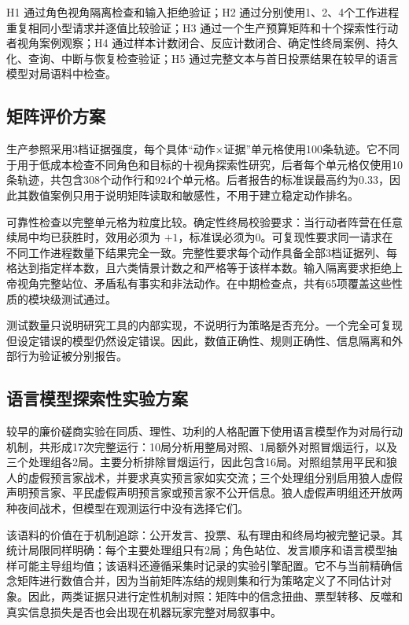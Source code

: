 \documentclass[UTF8,11pt,a4paper,fontset=windows]{ctexart}
\begin{document}
H1 通过角色视角隔离检查和输入拒绝验证；H2 通过分别使用1、2、4个工作进程重复相同小型请求并逐值比较验证；H3 通过一个生产预算矩阵和十个探索性行动者视角案例观察；H4 通过样本计数闭合、反应计数闭合、确定性终局案例、持久化、查询、中断与恢复检查验证；H5 通过完整文本与首日投票结果在较早的语言模型对局语料中检查。

\subsection{矩阵评价方案}

生产参照采用3档证据强度，每个具体“动作×证据”单元格使用100条轨迹。它不同于用于低成本检查不同角色和目标的十视角探索性研究，后者每个单元格仅使用10条轨迹，共包含308个动作行和924个单元格。后者报告的标准误最高约为0.33，因此其数值案例只用于说明矩阵读取和敏感性，不用于建立稳定动作排名。

可靠性检查以完整单元格为粒度比较。确定性终局校验要求：当行动者阵营在任意续局中均已获胜时，效用必须为 $+1$，标准误必须为0。可复现性要求同一请求在不同工作进程数量下结果完全一致。完整性要求每个动作具备全部3档证据列、每格达到指定样本数，且六类情景计数之和严格等于该样本数。输入隔离要求拒绝上帝视角完整站位、矛盾私有事实和非法动作。在中期检查点，共有65项覆盖这些性质的模块级测试通过。

测试数量只说明研究工具的内部实现，不说明行为策略是否充分。一个完全可复现但设定错误的模型仍然设定错误。因此，数值正确性、规则正确性、信息隔离和外部行为验证被分别报告。

\subsection{语言模型探索性实验方案}

较早的廉价磋商实验在同质、理性、功利的人格配置下使用语言模型作为对局行动机制，共形成17次完整运行：10局分析用整局对照、1局额外对照冒烟运行，以及三个处理组各2局。主要分析排除冒烟运行，因此包含16局。对照组禁用平民和狼人的虚假预言家战术，并要求真实预言家如实交流；三个处理组分别启用狼人虚假声明预言家、平民虚假声明预言家或预言家不公开信息。狼人虚假声明组还开放两种夜间战术，但模型在观测运行中没有选择它们。

该语料的价值在于机制追踪：公开发言、投票、私有理由和终局均被完整记录。其统计局限同样明确：每个主要处理组只有2局；角色站位、发言顺序和语言模型抽样可能主导组均值；该语料还遵循采集时记录的实验引擎配置。它不与当前精确信念矩阵进行数值合并，因为当前矩阵冻结的规则集和行为策略定义了不同估计对象。因此，两类证据只进行定性机制对照：矩阵中的信念扭曲、票型转移、反噬和真实信息损失是否也会出现在机器玩家完整对局叙事中。
\end{document}
